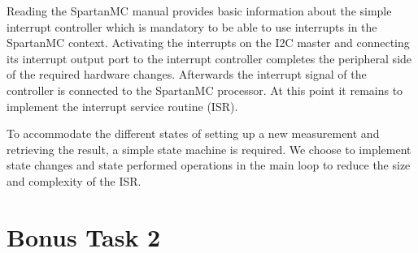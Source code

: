 		Reading the SpartanMC manual provides basic information about the simple interrupt controller which is mandatory to be able to use interrupts in the SpartanMC context. Activating the interrupts on the I2C master and connecting its interrupt output port to the interrupt controller completes the peripheral side of the required hardware changes. Afterwards the interrupt signal of the controller is connected to the SpartanMC processor. At this point it remains to implement the interrupt service routine (ISR).

		To accommodate the different states of setting up a new measurement and retrieving the result, a simple state machine is required. We choose to implement state changes and state performed operations in the main loop to reduce the size and complexity of the ISR. %


	\section{Bonus Task 2} %
	\label{sec:impl_bonus_task_2}
